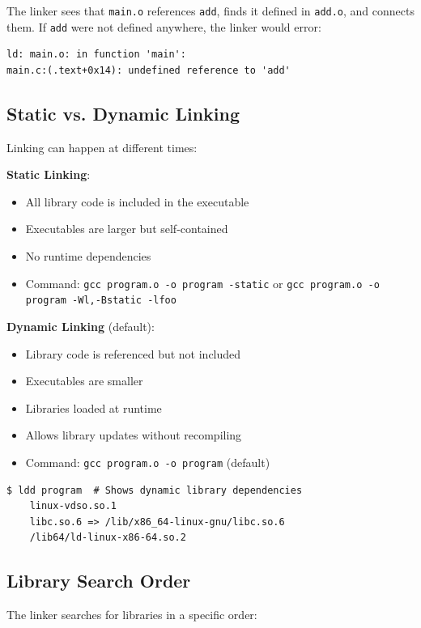 The linker sees that \texttt{main.o} references \texttt{add}, finds it defined in \texttt{add.o}, and connects them. If \texttt{add} were not defined anywhere, the linker would error:

\begin{verbatim}
ld: main.o: in function 'main':
main.c:(.text+0x14): undefined reference to 'add'
\end{verbatim}

\subsection{Static vs. Dynamic Linking}

Linking can happen at different times:

\textbf{Static Linking}:
\begin{itemize}
    \item All library code is included in the executable
    \item Executables are larger but self-contained
    \item No runtime dependencies
    \item Command: \texttt{gcc program.o -o program -static} or \texttt{gcc program.o -o program -Wl,-Bstatic -lfoo}
\end{itemize}

\textbf{Dynamic Linking} (default):
\begin{itemize}
    \item Library code is referenced but not included
    \item Executables are smaller
    \item Libraries loaded at runtime
    \item Allows library updates without recompiling
    \item Command: \texttt{gcc program.o -o program} (default)
\end{itemize}

\begin{verbatim}
$ ldd program  # Shows dynamic library dependencies
    linux-vdso.so.1
    libc.so.6 => /lib/x86_64-linux-gnu/libc.so.6
    /lib64/ld-linux-x86-64.so.2
\end{verbatim}

\subsection{Library Search Order}

The linker searches for libraries in a specific order:

